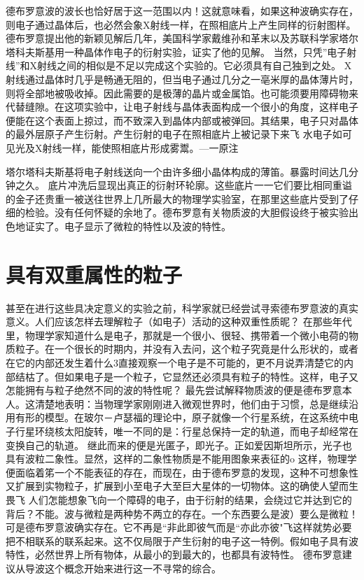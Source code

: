 德布罗意波的波长也恰好居于这一范围以内！这就意味看，如果这种波确实存在，则电子通过晶体后，也必然会象X射线一样，在照相底片上产生同样的衍射图样。
德布罗意提出他的新颖见解后几年，美国科学家戴维孙和革末以及苏联科学家塔尔塔科夫斯基用一种晶体作电子的衍射实验，证实了他的见解。
当然，只凭”电子射线”和X射线之间的相似是不足以完成这个实验的。它必须具有自己独到之处。
X射线通过晶体时几乎是畅通无阻的，但当电子通过几分之一亳米厚的晶体薄片时，则将全部地被吸收掉。因此需要的是极薄的晶片或金属馅。也可能须要用障碍物来代替缝隙。在这项实验中，让电子射线与晶体表面构成一个很小的角度，这样电子便能在这个表面上掠过，而不致深入到晶体内部或被弹回。其结果，电子只对晶体的最外层原子产生衍射。产生衍射的电子在照相底片上被记录下来飞
水电子如可见光及X射线一样，能使照相底片形成雾鬻。—一原注


塔尔塔科夫斯基将电子射线送向一个由许多细小晶体构成的薄笛。暴露时间达几分钟之久。
底片冲洗后显现出真正的衍射环轮廓。这些底片一一它们要比相同重谥的金子还贵重一被送往世界上几所最大的物理学实验室，在那里这些底片受到了仔细的检验。没有任何怀疑的余地了。德布罗意有关物质波的大胆假设终于被实验出色地证实了。电子显示了微粒的特性以及波的特性。

\section{具有双重属性的粒子}

甚至在进行这些具决定意义的实验之前，科学家就已经尝试寻索德布罗意波的真实意义。人们应该怎样去理解粒子（如电子）活动的这种双重性质昵？
在那些年代里，物理学家知道什么是电子，那就是一个很小、很轻、携带着一个微小电荷的物质粒子。在一个很长的时期内，并没有入去问，这个粒子究竟是什么形状的，或者在它的内部还发生着什么3直接观察一个电子是不可能的，更不月说弄清楚它的内部结枯了。但如果电子是一个粒子，它显然还必须具有粒子的特性。这样，电子又怎能拥有与粒子绝然不同的波的特性呢？
最先尝试解释物质波的便是德布罗意本人。这清楚地表明：当物理学家刚刚进入微观世界时，他们由于习惯，总是继续沿用有形的模型。在玻尔－卢瑟福的理论中，原子就像一个行星系统，在这系统中电子行星环绕核太阳旋转，唯一不同的是：行星总保持一定的轨道，而电子却经常在变换自己的轨道。
继此而来的便是光匿子，即光子。正如爱因斯坦所示，光子也具有波粒二象性。显然，这样的二象性物质是不能用图象来表征的o
这样，物理学便面临着笫一个不能表征的存在，而现在，由于德布罗意的发现，这种不可想象性又扩展到实物粒子，扩展到小至电子大至巨大星体的一切物体。这的确使人望而生畏飞
人们怎能想象飞向一个障碍的电子，由于衍射的结果，会绕过它并达到它的背后？不能。波与微粒是两种势不两立的存在。一个东西要么是波）要么是微粒！
可是德布罗意波确实存在。它不再是“非此即彼气而是“亦此亦彼"飞这样就势必要把不相联系的联系起来。这不仅局限于产生衍射的电子这一特例。假如电子具有波特性，必然世界上所有物体，从最小的到最大的，也都具有波特性。
德布罗意建议从导波这个概念开始来进行这一不寻常的综合。

